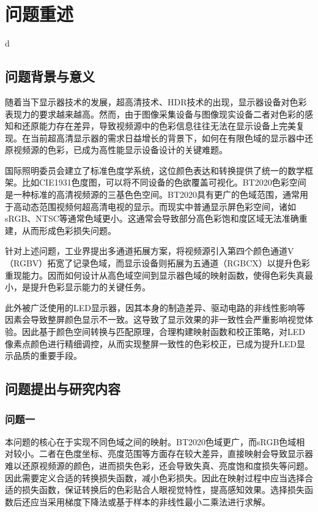 \chapter[\hspace{0pt}问题重述]{{\heiti{}\hspace{0pt}问题重述}}\label{chapter1: 问题重述}
d\cite{MAML}
\section[\hspace{-2pt}问题背景与意义]{{\heiti{} \hspace{-8pt}问题背景与意义}}\label{section1: 问题背景与意义}
随着当下显示器技术的发展，超高清技术、HDR技术的出现，显示器设备对色彩表现力的要求越来越高。然而，由于图像采集设备与图像现实设备二者对色彩的感知和还原能力存在差异，导致视频源中的色彩信息往往无法在显示设备上完美复现。在当前超高清显示器的需求日益增长的背景下，如何在有限色域的显示器中还原视频源的色彩，已成为高性能显示设备设计的关键难题。

国际照明委员会建立了标准色度学系统，这位颜色表达和转换提供了统一的数学框架。比如CIE1931色度图，可以将不同设备的色欲覆盖可视化。BT2020色彩空间是一种标准的高清视频源的三基色色空间。BT2020具有更广的色域范围，通常用于高动态范围视频何超高清电视的显示。而现实中普通显示屏色彩空间，诸如sRGB、NTSC等通常色域更小。这通常会导致部分高色彩饱和度区域无法准确重建，从而形成色彩损失问题。

针对上述问题，工业界提出多通道拓展方案，将视频源引入第四个颜色通道V（RGBV）拓宽了记录色域，而显示设备则拓展为五通道（RGBCX）以提升色彩重现能力。因而如何设计从高色域空间到显示器色域的映射函数，使得色彩失真最小，是提升色彩显示能力的关键任务。

此外被广泛使用的LED显示器，因其本身的制造差异、驱动电路的非线性影响等因素会导致整屏颜色显示不一致。这导致了显示效果的非一致性会严重影响视觉体验。因此基于颜色空间转换与匹配原理，合理构建映射函数和校正策略，对LED像素点颜色进行精细调控，从而实现整屏一致性的色彩校正，已成为提升LED显示品质的重要手段。

\section[\hspace{-2pt}问题提出与研究内容]{{\heiti{} \hspace{-8pt}问题提出与研究内容}}\label{section1: 问题提出与研究内容}

\subsection[\hspace{-2pt}问题一]{{\heiti{} \hspace{-8pt}问题一}}\label{section1: 问题一}
本问题的核心在于实现不同色域之间的映射。BT2020色域更广，而sRGB色域相对较小。二者在色度坐标、亮度范围等方面存在较大差异，直接映射会导致显示器难以还原视频源的颜色，进而损失色彩，还会导致失真、亮度饱和度损失等问题。因此需要定义合适的转换损失函数，减小色彩损失。因此在映射过程中应当选择合适的损失函数，保证转换后的色彩贴合人眼视觉特性，提高感知效果。选择损失函数后还应当采用梯度下降法或基于样本的非线性最小二乘法进行求解。
